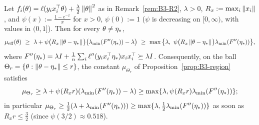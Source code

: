 \begin{proposition}\label{prop:B3-logistic}
Let $f_i(\theta)=\ell(y_ix_i^\top\theta)+\frac\lambda2\left\|\theta\right\|^2$ as in Remark~\ref{rem:B3-R2}, $\lambda>0$, $R_x:=\max_i\left\|x_i\right\|$, and $\psi(x):=\frac{1-e^{-x}}{x}$ for $x>0$, $\psi(0):=1$ ($\psi$ is decreasing on $[0,\infty)$, with values in $(0,1]$). Then for every $\theta\ne\eta_\ast$,
\[
\muEff(\theta)\ \ge\ \lambda+\psi\big(R_x\norm{\theta-\etastar}\big)\big(\lmin(F''(\etastar))-\lambda\big)\ \ge\ \max\big\{\lambda,\ \psi\big(R_x\norm{\theta-\etastar}\big)\lmin(F''(\etastar))\big\},
\]
where $F''(\eta_\ast)=\lambda I+\frac1n\sum_i\ell''(y_ix_i^\top\eta_\ast)x_ix_i^\top\succeq\lambda I$. Consequently, on the ball $\Theta_r=\{\theta:\left\|\theta-\eta_\ast\right\|\le r\}$, the constant $\mu_{\Theta_r}$ of Proposition~\ref{prop:B3-region} satisfies
\[
\mu_{\Theta_r}\ge\lambda+\psi(R_xr)(\lambda_{\min}(F''(\eta_\ast))-\lambda)\ge\max\{\lambda,\psi(R_xr)\lambda_{\min}(F''(\eta_\ast))\};
\]
in particular $\mu_{\Theta_r}\ge\frac12(\lambda+\lambda_{\min}(F''(\eta_\ast)))\ge\max\{\lambda,\frac12\lambda_{\min}(F''(\eta_\ast))\}$ as soon as $R_xr\le\frac32$ (since $\psi(3/2)\approx0.518$).
\end{proposition}
